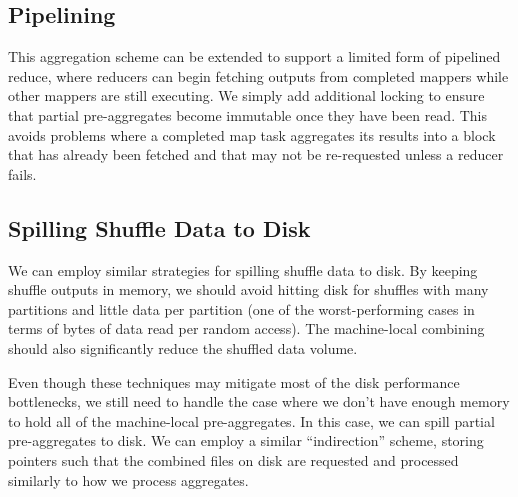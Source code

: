 \documentclass[12pt]{article}
\begin{document}
\begin{itemize}

\end{itemize}

\subsection{Pipelining}

This aggregation scheme can be extended to support a limited form of pipelined
reduce, where reducers can begin fetching outputs from completed mappers while
other mappers are still executing.  We simply add additional locking to ensure
that partial pre-aggregates become immutable once they have been read.  This
avoids problems where a completed map task aggregates its results into a block
that has already been fetched and that may not be re-requested unless
a reducer fails.

\subsection{Spilling Shuffle Data to Disk}

We can employ similar strategies for spilling shuffle data to disk.  By
keeping shuffle outputs in memory, we should avoid hitting disk for shuffles
with many partitions and little data per partition (one of the
worst-performing cases in terms of bytes of data read per random access).  The
machine-local combining should also significantly reduce the shuffled data
volume.

Even though these techniques may mitigate most of the disk performance
bottlenecks, we still need to handle the case where we don't have enough
memory to hold all of the machine-local pre-aggregates.  In this case, we can
spill partial pre-aggregates to disk.  We can employ a similar ``indirection''
scheme, storing pointers such that the combined files on disk are requested
and processed similarly to how we process aggregates.
\end{document}
